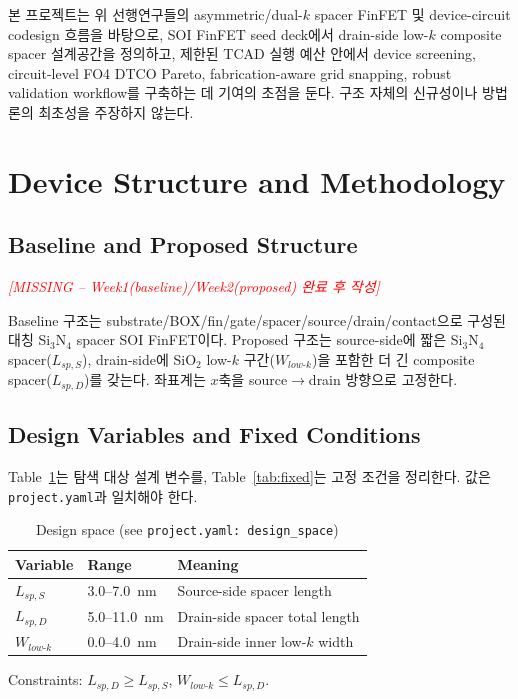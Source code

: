 \documentclass[journal]{IEEEtran}
\newcommand{\missing}[1]{\textcolor{red}{\textit{[MISSING -- #1]}}}
\begin{document}
본 프로젝트는 위 선행연구들의 asymmetric/dual-$k$ spacer FinFET 및 device-circuit codesign 흐름을 바탕으로, SOI FinFET seed deck에서 drain-side low-$k$ composite spacer 설계공간을 정의하고, 제한된 TCAD 실행 예산 안에서 device screening, circuit-level FO4 DTCO Pareto, fabrication-aware grid snapping, robust validation workflow를 구축하는 데 기여의 초점을 둔다. 구조 자체의 신규성이나 방법론의 최초성을 주장하지 않는다.

\section{Device Structure and Methodology}
\label{sec:device}

\subsection{Baseline and Proposed Structure}

\missing{Week1(baseline)/Week2(proposed) 완료 후 작성}

Baseline 구조는 substrate/BOX/fin/gate/spacer/source/drain/contact으로 구성된 대칭 Si$_3$N$_4$ spacer SOI FinFET이다. Proposed 구조는 source-side에 짧은 Si$_3$N$_4$ spacer($L_{sp,S}$), drain-side에 SiO$_2$ low-$k$ 구간($W_{low\text{-}k}$)을 포함한 더 긴 composite spacer($L_{sp,D}$)를 갖는다. 좌표계는 $x$축을 source$\rightarrow$drain 방향으로 고정한다.


\subsection{Design Variables and Fixed Conditions}

Table~\ref{tab:design-space}는 탐색 대상 설계 변수를, Table~\ref{tab:fixed}는 고정 조건을 정리한다. 값은 \texttt{project.yaml}과 일치해야 한다.

\begin{table}[t]
\centering
\caption{Design space (see \texttt{project.yaml: design\_space})}
\label{tab:design-space}
\begin{tabular}{@{}lll@{}}
\toprule
Variable & Range & Meaning \\
\midrule
$L_{sp,S}$ & 3.0--7.0~nm & Source-side spacer length \\
$L_{sp,D}$ & 5.0--11.0~nm & Drain-side spacer total length \\
$W_{low\text{-}k}$ & 0.0--4.0~nm & Drain-side inner low-$k$ width \\
\bottomrule
\end{tabular}

\vspace{2pt}
\footnotesize Constraints: $L_{sp,D} \geq L_{sp,S}$, $W_{low\text{-}k} \leq L_{sp,D}$.
\end{table}
\end{document}
